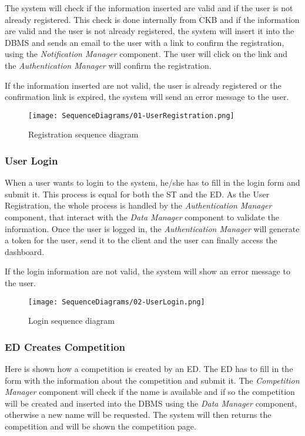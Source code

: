 The system will check if the information inserted are valid and if the user is not already registered. This check is done internally from CKB and if the information are valid and the user is not already registered, the system will insert it into the DBMS and sends an email to the user with a link to confirm the registration, using the \textit{Notification Manager} component. The user will click on the link and the \textit{Authentication Manager} will confirm the registration.

If the information inserted are not valid, the user is already registered or the confirmation link is expired, the system will send an error message to the user.

\begin{figure}[H]
  \centering
  \texttt{[image: SequenceDiagrams/01-UserRegistration.png]}
  \caption{Registration sequence diagram}
  \label{fig:registratio_diagramn}
\end{figure}

\subsubsection*{User Login}
\label{ss:login_diagram}%
When a user wants to login to the system, he/she has to fill in the login form and submit it. This process is equal for both the ST and the ED. As the User Registration, the whole process is handled by the \textit{Authentication Manager} component, that interact with the \textit{Data Manager} component to validate the information. Once the user is logged in, the \textit{Authentication Manager} will generate a token for the user, send it to the client and the user can finally access the dashboard.

If the login information are not valid, the system will show an error message to the user.

\begin{figure}[H]
  \centering
  \texttt{[image: SequenceDiagrams/02-UserLogin.png]}
  \caption{Login sequence diagram}
  \label{fig:login_diagramn}
\end{figure}

\subsubsection*{ED Creates Competition}
\label{ss:create_competition_diagram}
Here is shown how a competition is created by an ED. The ED has to fill in the form with the information about the competition and submit it. The \textit{Competition Manager} component will check if the name is available and if so the competition will be created and inserted into the DBMS using the \textit{Data Manager} component, otherwise a new name will be requested. The system will then returns the competition and will be shown the competition page.

